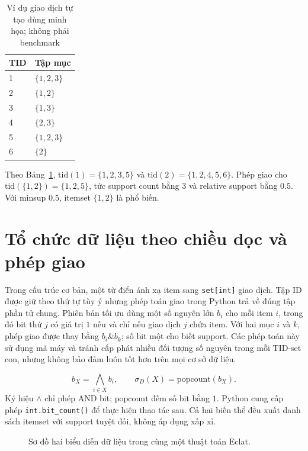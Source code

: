 \documentclass[conference,10pt]{IEEEtran}
\newcommand{\myitem}[1]{\texttt{#1}}
\begin{document}
\begin{table}[t]
\centering\caption{Ví dụ giao dịch tự tạo dùng minh họa; không phải benchmark}\label{tab:toy}
\begin{tabular}{@{}ll@{}}\toprule
TID & Tập mục\\\midrule
1 & $\{1,2,3\}$\\
2 & $\{1,2\}$\\
3 & $\{1,3\}$\\
4 & $\{2,3\}$\\
5 & $\{1,2,3\}$\\
6 & $\{2\}$\\\bottomrule
\end{tabular}
\end{table}

Theo Bảng~\ref{tab:toy}, $\mathrm{tid}(1)=\{1,2,3,5\}$ và $\mathrm{tid}(2)=\{1,2,4,5,6\}$. Phép giao cho $\mathrm{tid}(\{1,2\})=\{1,2,5\}$, tức support count bằng $3$ và relative support bằng $0.5$. Với minsup $0.5$, itemset $\{1,2\}$ là phổ biến.

\section{Tổ chức dữ liệu theo chiều dọc và phép giao}
Trong cấu trúc cơ bản, một từ điển ánh xạ item sang \myitem{set[int]} giao dịch. Tập ID được giữ theo thứ tự tùy ý nhưng phép toán giao trong Python trả về đúng tập phần tử chung. Phiên bản tối ưu dùng một số nguyên lớn $b_i$ cho mỗi item $i$, trong đó bit thứ $j$ có giá trị $1$ nếu và chỉ nếu giao dịch $j$ chứa item. Với hai mục $i$ và $k$, phép giao được thay bằng $b_i\mathbin{\&}b_k$; số bit một cho biết support. Các phép toán này sử dụng mã máy và tránh cấp phát nhiều đối tượng số nguyên trong mỗi TID-set con, nhưng không bảo đảm luôn tốt hơn trên mọi cơ sở dữ liệu.

\begin{equation}\label{eq:bits}
 b_X=\bigwedge_{i\in X}b_i,\qquad \sigma_D(X)=\mathrm{popcount}(b_X).
\end{equation}
Ký hiệu $\wedge$ chỉ phép AND bit; $\mathrm{popcount}$ đếm số bit bằng $1$. Python cung cấp phép \myitem{int.bit\_count()} để thực hiện thao tác sau. Cả hai biến thể đều xuất danh sách itemset với support tuyệt đối, không áp dụng xấp xỉ.

\begin{figure}[t]
\centering
{}
\caption{Sơ đồ hai biểu diễn dữ liệu trong cùng một thuật toán Eclat.}\label{fig:architecture}
\end{figure}
\end{document}
